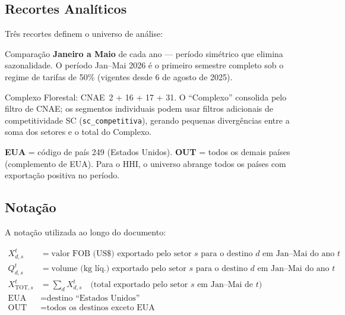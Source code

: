 \documentclass[12pt, a4paper]{article}
\begin{document}
\subsection{Recortes Analíticos}

Três recortes definem o universo de análise:

\begin{description}[style=nextline]
  \item[Recorte temporal]
    Comparação \textbf{Janeiro a Maio} de cada ano --- período simétrico que elimina
    sazonalidade. O período Jan--Mai 2026 é o primeiro semestre completo sob o
    regime de tarifas de 50\% (vigentes desde 6 de agosto de 2025).

  \item[Recorte setorial]
    Complexo Florestal: CNAE~2 + 16 + 17 + 31. O ``Complexo'' consolida pelo
    filtro de CNAE; os segmentos individuais podem usar filtros adicionais
    de competitividade SC (\texttt{sc\_competitiva}), gerando pequenas divergências
    entre a soma dos setores e o total do Complexo.

  \item[Recorte geográfico]
    \textbf{EUA} = código de país 249 (Estados Unidos).
    \textbf{OUT} = todos os demais países (complemento de EUA).
    Para o HHI, o universo abrange todos os países com exportação positiva no período.
\end{description}

\subsection{Notação}

A notação utilizada ao longo do documento:

\begin{align*}
  X_{d,s}^{t}
    &= \text{valor FOB (US\$) exportado pelo setor }s
       \text{ para o destino }d\text{ em Jan--Mai do ano }t \\
  Q_{d,s}^{t}
    &= \text{volume (kg líq.) exportado pelo setor }s
       \text{ para o destino }d\text{ em Jan--Mai do ano }t \\
  X_{\text{TOT},s}^{t}
    &= \textstyle\sum_{d} X_{d,s}^{t}
       \quad\text{(total exportado pelo setor }s\text{ em Jan--Mai de }t\text{)} \\
  \text{EUA}
    &= \text{destino ``Estados Unidos''} \\
  \text{OUT}
    &= \text{todos os destinos exceto EUA}
\end{align*}
\end{document}
